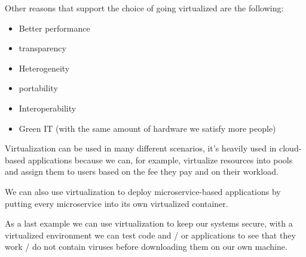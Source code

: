 Other reasons that support the choice of going virtualized are the following:
\begin{itemize}
    \item Better performance
    \item transparency
    \item Heterogeneity
    \item portability
    \item Interoperability
    \item Green IT (with the same amount of hardware we satisfy more people)
\end{itemize}
Virtualization can be used in many different scenarios, it's heavily used in cloud-based applications because we can, for example, virtualize resources into pools and assign them to users based on the fee they pay and on their workload.

We can also use virtualization to deploy microservice-based applications by putting every microservice into its own virtualized container.

As a last example we can use virtualization to keep our systems secure, with a virtualized environment we can test code and / or applications to see that they work / do not contain viruses before downloading them on our own machine.

